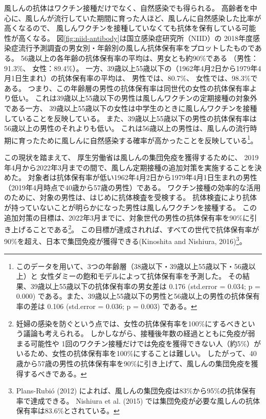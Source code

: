 \documentclass[
  11pt,
  a4paper,
]{article}
\begin{document}
風しんの抗体はワクチン接種だけでなく、自然感染でも得られる。
高齢者を中心に、風しんが流行していた期間に育った人ほど、風しんに自然感染した比率が高くなるので、
風しんワクチンを接種していなくても抗体を保有している可能性が高くなる。
図\ref{fig:niid-antibody}は国立感染症研究所（NIID）の
2018年度感染症流行予測調査の男女別・年齢別の風しん抗体保有率をプロットしたものである。
56歳以上の各年齢の抗体保有率の平均は、男女とも約90\%である
（男性：91.3\%、
女性：89.4\%）。
一方、39歳以上55歳以下の（1962年4月2日から1979年4月1日生まれ）の抗体保有率の平均は、
男性では、80.7\%、
女性では、98.3\%である。
つまり、この年齢層の男性の抗体保有率は同世代の女性の抗体保有率より低い。
これは39歳以上55歳以下の男性は風しんワクチンの定期接種の対象外である一方、
39歳以上55歳以下の女性は中学生のときに風しんワクチンを接種していることを反映している。
また、39歳以上55歳以下の男性の抗体保有率は56歳以上の男性のそれよりも低い。
これは56歳以上の男性は、風しんの流行時期に育ったために風しんに自然感染する確率が高かったことを反映している\footnote{このデータを用いて、3つの年齢層（38歳以下・39歳以上55歳以下・56歳以上）と
  女性ダミーの飽和モデルによって抗体保有率を予測した。
  その結果、39歳以上55歳以下の抗体保有率の男女差は
  0.176 (std.error = 0.034; p = 0.000)
  である。また、39歳以上55歳以下の男性と56歳以上の男性の抗体保有率の差は
  0.106 (std.error = 0.036; p = 0.003)
  である。}。

この現状を踏まえて、
厚生労働省は風しんの集団免疫を獲得するために、
2019年4月から2022年3月までの間で、風しん定期接種の追加対策を実施することを決めた。
対象者は抗体保有率が低い1962年4月2日から1979年4月1日生まれの男性（2019年4月時点で40歳から57歳の男性）である。
ワクチン接種の効率的な活用のために、対象の男性は、はじめに抗体検査を受検する。
抗体検査により抗体が持っていないことが明らかになった男性は風しんワクチンを接種する。
この追加対策の目標は、2022年3月までに、対象世代の男性の抗体保有率を90\%に引き上げることである\footnote{妊婦の感染を防ぐという点では、女性の抗体保有率を100\%にするべきという議論も考えられる。
  しかしながら、接種後年数の経過とともに免疫が弱まる可能性や
  1回のワクチン接種だけでは免疫を獲得できない人（約5\%）がいるため、女性の抗体保有率を100\%にすることは難しい。
  したがって、40歳から57歳の男性の抗体保有率を90\%に引き上げて、風しんの集団免疫を獲得するべきである。}。
この目標が達成されれば、すべての世代で抗体保有率が90\%を超え、日本で集団免疫が獲得できる(Kinoshita and Nishiura, 2016)\footnote{Plans-Rubió (2012) によれば、風しんの集団免疫は83\%から95\%の抗体保有率で達成できる。
  Nishiura et al. (2015) では集団免疫が必要な風しんの抗体保有率は83.6\%とされている。}。
\end{document}
